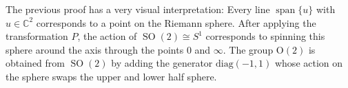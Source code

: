 \documentclass{amsart}
\newcommand{\C}{\mathbb{C}}
\DeclareMathOperator{\SO}{SO}
\DeclareMathOperator{\spann}{span}
\begin{document}
The previous proof has a very visual interpretation: Every line $\spann \{u\}$ with $u \in \C^2$ corresponds to a point on the Riemann sphere. After applying the transformation $P$, the action of $\SO(2) \cong S^1$ corresponds to spinning this sphere around the axis through the points $0$ and $\infty$. The group $\mathrm{O}(2)$ is obtained from $\SO(2)$ by adding the generator $\mathrm{diag}(-1, 1)$ whose action on the sphere swaps the upper and lower half sphere.

        
        
\end{document}
